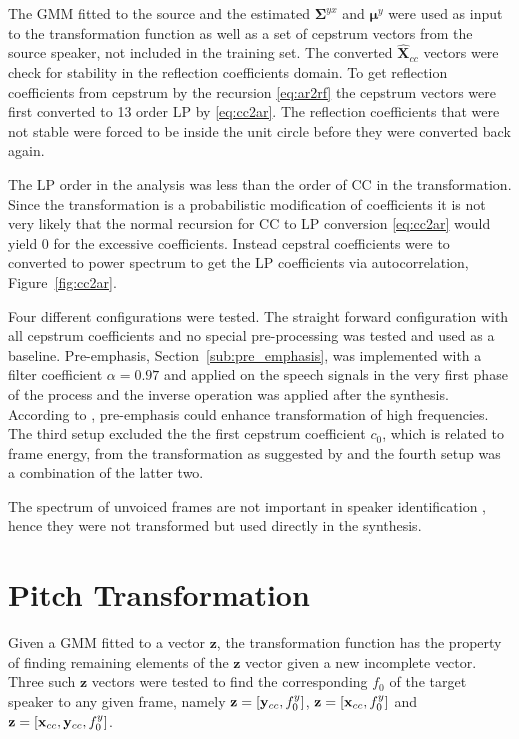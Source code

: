 The GMM fitted to the source and the estimated $\mathbf{\Sigma}^{yx}$ and $\boldsymbol{\mu}^y$ were used as input to the transformation function as well as a set of cepstrum vectors from the source speaker, not included in the training set. The converted $\mathbf{\hat{X}}_{cc}$ vectors were check for stability in the reflection coefficients domain. To get reflection coefficients from cepstrum by the recursion \eqref{eq:ar2rf} the cepstrum vectors were first converted to 13 order LP by \eqref{eq:cc2ar}. The reflection coefficients that were not stable were forced to be inside the unit circle before they were converted back again. 

The LP order in the analysis was less than the order of CC in the transformation. Since the transformation is a probabilistic modification of coefficients it is not very likely that the normal recursion for CC to LP conversion \eqref{eq:cc2ar} would yield 0 for the excessive coefficients. Instead cepstral coefficients were to converted to power spectrum to get the LP coefficients via autocorrelation, Figure~\ref{fig:cc2ar}.

Four different configurations were tested. The straight forward configuration with all cepstrum coefficients and no special pre-processing was tested and used as a baseline. Pre-emphasis, Section~\ref{sub:pre_emphasis}, was implemented with a filter coefficient $\alpha=0.97$ and applied on the speech signals in the very first phase of the process and the inverse operation was applied after the synthesis. According to \cite{turk06}, pre-emphasis could enhance transformation of high frequencies. The third setup excluded the the first cepstrum coefficient $c_0$, which is related to frame energy, from the transformation as suggested by \cite{stylianou98} and the fourth setup was a combination of the latter two.

The spectrum of unvoiced frames are not important in speaker identification , hence they were not transformed but used directly in the synthesis.

\section{Pitch Transformation} %
\label{sec:pitch_transformation}
Given a GMM fitted to a vector $\mathbf{z}$, the transformation function has the property of finding remaining elements of the $\mathbf{z}$ vector given a new incomplete vector. Three such $\mathbf{z}$ vectors were tested to find the corresponding $f_0$ of the target speaker to any given frame, namely $\mathbf{z} = \left[\mathbf{y}_{cc},f_0^y\right]$, $\mathbf{z} = \left[\mathbf{x}_{cc},f_0^y\right]$ and $\mathbf{z} = \left[\mathbf{x}_{cc},\mathbf{y}_{cc},f_0^y\right]$.

